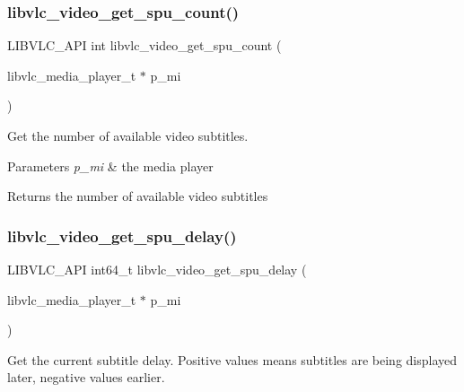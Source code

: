 \subsubsection{\texorpdfstring{libvlc\+\_\+video\+\_\+get\+\_\+spu\+\_\+count()}{libvlc\_video\_get\_spu\_count()}}
{\footnotesize\ttfamily L\+I\+B\+V\+L\+C\+\_\+\+A\+PI int libvlc\+\_\+video\+\_\+get\+\_\+spu\+\_\+count (\begin{DoxyParamCaption}\item[{libvlc\+\_\+media\+\_\+player\+\_\+t $\ast$}]{p\+\_\+mi }\end{DoxyParamCaption})}

Get the number of available video subtitles.


\begin{DoxyParams}{Parameters}
{\em p\+\_\+mi} & the media player \\
\hline
\end{DoxyParams}
\begin{DoxyReturn}{Returns}
the number of available video subtitles 
\end{DoxyReturn}
\mbox{\label{group__libvlc__video_ga5302f641bc51d3e2169678f8c242c1b0}} 
\subsubsection{\texorpdfstring{libvlc\+\_\+video\+\_\+get\+\_\+spu\+\_\+delay()}{libvlc\_video\_get\_spu\_delay()}}
{\footnotesize\ttfamily L\+I\+B\+V\+L\+C\+\_\+\+A\+PI int64\+\_\+t libvlc\+\_\+video\+\_\+get\+\_\+spu\+\_\+delay (\begin{DoxyParamCaption}\item[{libvlc\+\_\+media\+\_\+player\+\_\+t $\ast$}]{p\+\_\+mi }\end{DoxyParamCaption})}

Get the current subtitle delay. Positive values means subtitles are being displayed later, negative values earlier.


